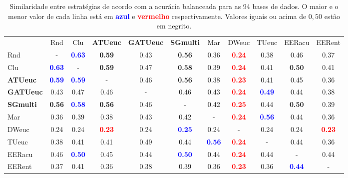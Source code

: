 \begin{table}[h]
\caption{Similaridade entre estratégias de acordo com a acurácia balanceada para as 94 bases de dados. O maior e o menor valor de cada linha está em \textcolor{blue}{\textbf{azul}} e \textcolor{red}{\textbf{vermelho}} respectivamente. Valores iguais ou acima de $0,50$ estão em negrito.}
\begin{center}\begin{tabular}{lcc|cc|cc|cc|cc}
 				& Rnd & Clu & \textbf{ATUeuc} & \textbf{GATUeuc} & \textbf{SGmulti} & Mar & DWeuc & TUeuc & EERacu & EERent \\Rnd	& - & \textcolor{blue}{\textbf{  0.63}} & \textbf{  0.59} &   0.43 & \textbf{  0.56} &   0.36 & \textcolor{red}{\textbf{  0.24}} &   0.38 &   0.46 &   0.37 \\
Clu	& \textcolor{blue}{\textbf{  0.63}} & - & \textbf{  0.59} &   0.47 & \textbf{  0.58} &   0.39 & \textcolor{red}{\textbf{  0.24}} &   0.41 & \textbf{  0.50} &   0.41 \\ \hline
\textbf{ATUeuc}	& \textcolor{blue}{\textbf{  0.59}} & \textcolor{blue}{\textbf{  0.59}} & - &   0.46 & \textbf{  0.56} &   0.38 & \textcolor{red}{\textbf{  0.23}} &   0.41 &   0.45 &   0.36 \\
\textbf{GATUeuc}	&   0.43 &   0.47 &   0.46 & - &   0.46 &   0.43 & \textcolor{red}{\textbf{  0.24}} & \textcolor{blue}{\textbf{  0.49}} &   0.44 &   0.38 \\ \hline
\textbf{SGmulti}	& \textbf{  0.56} & \textcolor{blue}{\textbf{  0.58}} & \textbf{  0.56} &   0.46 & - &   0.42 & \textcolor{red}{\textbf{  0.25}} &   0.44 & \textbf{  0.50} &   0.39 \\
Mar	&   0.36 &   0.39 &   0.38 &   0.43 &   0.42 & - & \textcolor{red}{\textbf{  0.24}} & \textcolor{blue}{\textbf{  0.56}} &   0.44 &   0.36 \\ \hline
DWeuc	&   0.24 &   0.24 & \textcolor{red}{\textbf{  0.23}} &   0.24 & \textcolor{blue}{\textbf{  0.25}} &   0.24 & - &   0.24 &   0.24 & \textcolor{red}{\textbf{  0.23}} \\
TUeuc	&   0.38 &   0.41 &   0.41 &   0.49 &   0.44 & \textcolor{blue}{\textbf{  0.56}} & \textcolor{red}{\textbf{  0.24}} & - &   0.44 &   0.36 \\ \hline
EERacu	&   0.46 & \textcolor{blue}{\textbf{  0.50}} &   0.45 &   0.44 & \textcolor{blue}{\textbf{  0.50}} &   0.44 & \textcolor{red}{\textbf{  0.24}} &   0.44 & - &   0.44 \\
EERent	&   0.37 &   0.41 &   0.36 &   0.38 &   0.39 &   0.36 & \textcolor{red}{\textbf{  0.23}} &   0.36 & \textcolor{blue}{\textbf{  0.44}} & - \\ \hline\end{tabular}\label{stratDistsRedux}
\end{center}
\end{table}